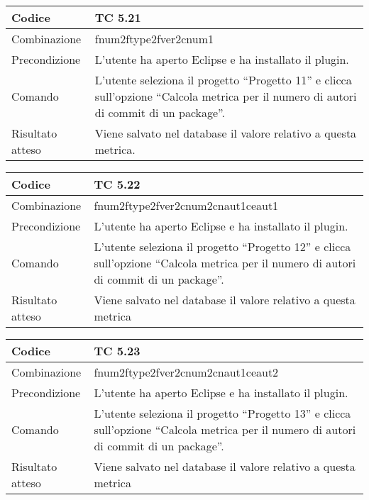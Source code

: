 \begin{table}[ht]
\begin{tabular}{|p{3cm}|p{9cm}|}
\hline
\cellcolor{lightgray}Codice				& TC 5.21								\\
\hline
\cellcolor{lightgray}Combinazione		& fnum2ftype2fver2cnum1									\\
\hline
\cellcolor{lightgray}Precondizione		& L'utente ha aperto Eclipse e ha installato il plugin.		\\
\hline
\cellcolor{lightgray}Comando			& L'utente seleziona il progetto ``Progetto 11''  e clicca sull'opzione ``Calcola metrica per il numero di autori di commit di un package''.	\\
\hline
\cellcolor{lightgray}Risultato atteso	& Viene salvato nel database il valore relativo a questa metrica.\\
\hline
\end{tabular}
\end{table}

\begin{table}[ht]
\begin{tabular}{|p{3cm}|p{9cm}|}
\hline
\cellcolor{lightgray}Codice				& TC 5.22								\\
\hline
\cellcolor{lightgray}Combinazione		& fnum2ftype2fver2cnum2cnaut1ceaut1 									\\
\hline
\cellcolor{lightgray}Precondizione		& L'utente ha aperto Eclipse e ha installato il plugin.				\\
\hline
\cellcolor{lightgray}Comando			& L'utente seleziona il progetto ``Progetto 12''  e clicca sull'opzione ``Calcola metrica per il numero di autori di commit di un package''.	\\
\hline
\cellcolor{lightgray}Risultato atteso	& Viene salvato nel database il valore relativo a questa metrica	\\
\hline
\end{tabular}
\end{table}

\begin{table}[ht]
\begin{tabular}{|p{3cm}|p{9cm}|}
\hline
\cellcolor{lightgray}Codice				& TC 5.23								\\
\hline
\cellcolor{lightgray}Combinazione		& fnum2ftype2fver2cnum2cnaut1ceaut2									\\
\hline
\cellcolor{lightgray}Precondizione		& L'utente ha aperto Eclipse e ha installato il plugin.					\\
\hline
\cellcolor{lightgray}Comando			& L'utente seleziona il progetto ``Progetto 13''  e clicca sull'opzione ``Calcola metrica per il numero di autori di commit di un package''.	\\
\hline
\cellcolor{lightgray}Risultato atteso	& Viene salvato nel database il valore relativo a questa metrica	\\
\hline
\end{tabular}
\end{table}

